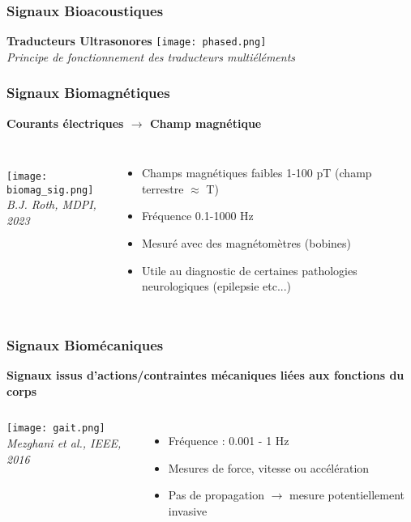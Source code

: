 \documentclass{beamer}
\begin{document}
\begin{frame}
\frametitle{Signaux Bioacoustiques}
\textbf{Traducteurs Ultrasonores}
\center
\texttt{[image: phased.png]}\\
\textit{\footnotesize{Principe de fonctionnement des traducteurs multiéléments}}

\end{frame}

\begin{frame}
\frametitle{Signaux Biomagnétiques}
\textbf{Courants électriques $\rightarrow$ Champ magnétique}
\begin{columns}
\column{60mm}
\vspace{0.2cm}\\
 \texttt{[image: biomag\_sig.png]}\\
 \vspace{0.1cm}
 \textit{B.J. Roth, MDPI, 2023}
\column{60mm}
\begin{itemize}
\item Champs magnétiques faibles 1-100 pT (champ terrestre $\approx$  \textmu T)
\vspace{0.2cm}
\item Fréquence 0.1-1000 Hz
\vspace{0.2cm}
\item Mesuré avec des magnétomètres (bobines)
\vspace{0.2cm}
\item Utile au diagnostic de certaines pathologies neurologiques (epilepsie etc...)
\end{itemize}

\end{columns}
\end{frame}

\begin{frame}
\frametitle{Signaux Biomécaniques}
\textbf{Signaux issus d'actions/contraintes mécaniques liées aux fonctions du corps}
\begin{columns}
\column{60mm}
 \texttt{[image: gait.png]}\\
 \vspace{0.1cm}
 \textit{Mezghani et al., IEEE, 2016}

\column{60mm}
\begin{itemize}
\item Fréquence : 0.001 - 1 Hz
\vspace{0.2cm}
\item Mesures de force, vitesse ou accélération 
\vspace{0.2cm}
\item Pas de propagation $\rightarrow$ mesure potentiellement invasive
\vspace{0.2cm}
\end{itemize}
\end{columns}
\end{frame}
\end{document}
